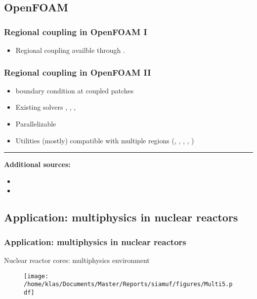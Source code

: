 \documentclass[9pt,handout]{beamer} %
\begin{document}
\subsection{OpenFOAM}
\begin{frame}%
\frametitle{Regional coupling in OpenFOAM I}
\begin{itemize}
    \item Regional coupling availble through .
            
\end{itemize}
\end{frame}

\begin{frame}%
\frametitle{Regional coupling in OpenFOAM II}
\begin{itemize}
    \item {} boundary condition at coupled patches
    \pause
    \item Existing solvers , , , 
    \pause
    \item Parallelizable 
    \pause
    \item Utilities (mostly) compatible with multiple regions (, , , , ) 
\end{itemize}
\pause
\vfill

\rule{0.5\textwidth}{0.5pt}\newline
\scriptsize
{\bf Additional sources:}
\begin{itemize}
    \item {}
    \item {}
\end{itemize}
\end{frame}

\subsection{Application: multiphysics in nuclear reactors}

\begin{frame}%
\frametitle{Application: multiphysics in nuclear reactors}
Nuclear reactor cores: multiphysics environment
\begin{figure}[ht]
    \centering
    \texttt{[image: /home/klas/Documents/Master/Reports/siamuf/figures/Multi5.pdf]}
\end{figure}
\end{frame}
\end{document}
